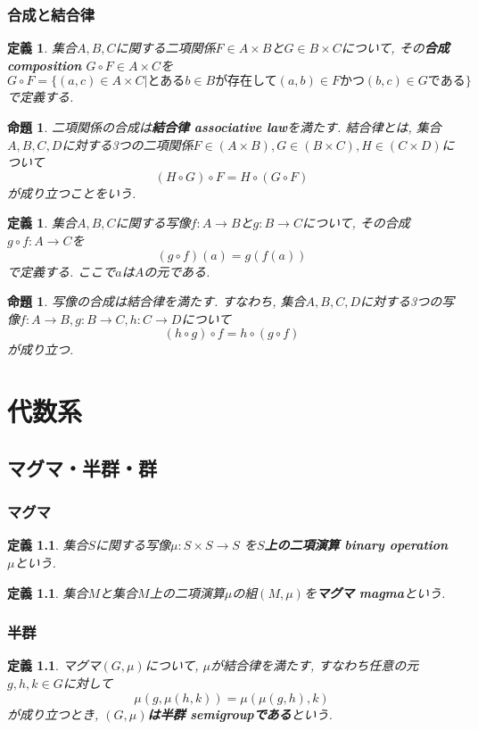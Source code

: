 \documentclass[dvipdfmx]{jsbook}
\theoremstyle{plain}
\newtheorem{Def}[thm]{定義}
\newtheorem{Prop}[thm]{命題}
\begin{document}
\subsection{合成と結合律}
\begin{Def}
集合$A,B,C$に関する二項関係$F\in A\times B$と$G\in B\times C$について, その{\bf 合成 composition} $G\circ F\in A\times C$を
\[
G\circ F=\{(a,c)\in A\times C|\text{とある}b\in B\text{が存在して}(a,b)\in F \text{かつ} (b,c)\in G\text{である}\}
\]
で定義する.
\end{Def}
\begin{Prop}
二項関係の合成は{\bf 結合律 associative law}を満たす.
結合律とは, 集合$A,B,C,D$に対する3つの二項関係$F\in(A\times B),G\in(B\times C),H\in(C\times D)$について
\[
(H\circ G)\circ F=H\circ (G\circ F)
\]
が成り立つことをいう.
\end{Prop}

\begin{Def}
集合$A,B,C$に関する写像$f:A\rightarrow B$と$g:B\rightarrow C$について, その合成 $g\circ f:A\rightarrow C$を
\[
(g\circ f)(a)=g(f(a))
\]
で定義する. ここで$a$は$A$の元である.
\end{Def}
\begin{Prop}
写像の合成は結合律を満たす.
すなわち, 集合$A,B,C,D$に対する3つの写像$f:A\rightarrow B, g:B\rightarrow C,
h:C\rightarrow D$について
\[
(h\circ g)\circ f=h\circ(g\circ f)
\]
が成り立つ.
\end{Prop}

\chapter{代数系}
\section{マグマ・半群・群}
\subsection{マグマ}
\begin{Def}
集合$S$に関する写像$\mu:S\times S\rightarrow S$
を{\bf $S$上の二項演算 binary operation $\mu$}という.
\end{Def}
\begin{Def}
集合$M$と集合$M$上の二項演算$\mu$の組$(M,\mu)$を{\bf マグマ magma}という.
\end{Def}
\subsection{半群}
\begin{Def}
マグマ$(G,\mu)$について,
$\mu$が結合律を満たす, すなわち任意の元$g,h,k\in G$に対して\[\mu(g,\mu(h,k))=\mu(\mu(g,h),k)\]
が成り立つとき, {\bf $(G,\mu)$は半群 semigroupである}という.
\end{Def}
\end{document}

